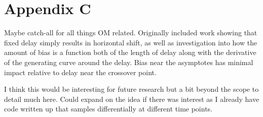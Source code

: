 \documentclass{article}
\begin{document}
\section*{Appendix C}

Maybe catch-all for all things OM related. Originally included work showing that fixed delay simply results in horizontal shift, as well as investigation into how the amount of bias is a function both of the length of delay along with the derivative of the generating curve around the delay. Bias near the asymptotes has minimal impact relative to delay near the crossover point.

I think this would be interesting for future research but a bit beyond the scope to detail much here. Could expand on the idea if there was interest as I already have code written up that samples differentially at different time points.
\end{document}
